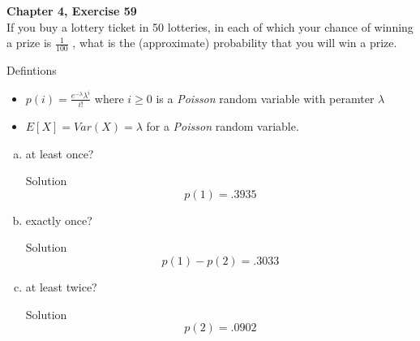\documentclass{article}
\begin{document}
\begin{spacing}{1.1}
\newpage
\begin{homeworkProblem}
  {\bf Chapter 4, Exercise 59}\\
  If you buy a lottery ticket in 50 lotteries, in each of which your 
  chance of winning a prize is $\frac{ 1}{ 100}$ , what
  is the (approximate) probability that you will win
  a prize.
  \begin{homeworkSection}{Defintions}
    \begin{itemize}
      \item $p( i) = \frac{ e^{-\lambda} \lambda^i}{ i!}$ where 
        $i \ge 0$ is a \emph{Poisson} random variable with peramter $\lambda$ 
      \item $E[ X] = Var( X) = \lambda$ for a \emph{Poisson} random variable.
    \end{itemize}
  \end{homeworkSection}
  \begin{enumerate}[(a)]
    \item at least once?
      \begin{homeworkSection}{Solution}
        \[p(1) = .3935\]
      \end{homeworkSection}
    \item exactly once?
      \begin{homeworkSection}{Solution}
        \[p( 1) - p( 2) = .3033\]
      \end{homeworkSection}
    \item at least twice?
      \begin{homeworkSection}{Solution}
        \[p(2) = .0902\]
      \end{homeworkSection}
  \end{enumerate}
\end{homeworkProblem}
\end{spacing}
\end{document}
